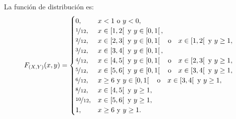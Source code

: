 \begin{ejercicio}
    La función de distribución es:
    \begin{equation*}
        F_{(X,Y)}(x,y) = \begin{cases}
            0, & x<1 \text{ o } y<0, \\
            \nicefrac{1}{12}, & x\in \left[1,2\right[ \text{ y } y\in \left[0,1\right[, \\
            \nicefrac{2}{12}, & x\in \left[2,3\right[ \text{ y } y\in \left[0,1\right[ \quad \text{o} \quad x\in \left[1,2\right[ \text{ y } y\geq 1, \\
            \nicefrac{3}{12}, & x\in \left[3,4\right[ \text{ y } y\in \left[0,1\right[, \\
            \nicefrac{4}{12}, & x\in \left[4,5\right[ \text{ y } y\in \left[0,1\right[ \quad \text{o} \quad x\in \left[2,3\right[ \text{ y } y\geq 1, \\
            \nicefrac{5}{12}, & x\in \left[5,6\right[ \text{ y } y\in \left[0,1\right[ \quad \text{o} \quad x\in \left[3,4\right[ \text{ y } y\geq 1, \\
            \nicefrac{6}{12}, & x\geq 6 \text{ y } y\in \left[0,1\right[ \quad \text{o} \quad x\in \left[3,4\right[ \text{ y } y\geq 1, \\
            \nicefrac{8}{12}, & x\in \left[4,5\right[ \text{ y } y\geq 1, \\
            \nicefrac{10}{12}, & x\in \left[5,6\right[ \text{ y } y\geq 1, \\
            1, & x\geq 6 \text{ y } y\geq 1.
        \end{cases}
    \end{equation*}
\end{ejercicio}

